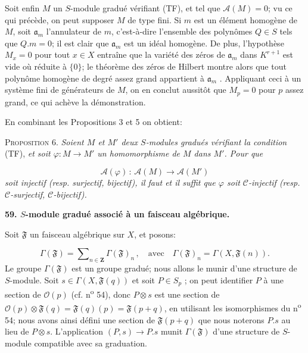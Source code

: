 Soit enfin $M$ un $S$-module gradué vérifiant (TF), et tel que $\mathcal{A}(M) = 0$; vu ce qui précède, on peut supposer $M$ de type fini. Si $m$ est un élément homogène de $M$, soit $\mathfrak{a}_{m}$ l'annulateur de $m$, c'est-à-dire l'ensemble des polynômes $Q \in S$ tels que $Q.m = 0$; il est clair que $\mathfrak{a}_{m}$ est un idéal homogène. De plus, l'hypothèse $M_{x} = 0$ pour tout $x \in X$ entraîne que la variété des zéros de $\mathfrak{a}_{m}$ dans $K^{r+1}$ est vide où réduite à $\{0\}$; le théorème des zéros de Hilbert montre alors que tout polynôme homogène de degré assez grand appartient à $\mathfrak{a}_{m}$ . Appliquant ceci à un système fini de générateurs de $M$, on en conclut aussitôt que $M_{p} = 0$ pour $p$ assez grand, ce qui achève la démonstration.

En combinant les Propositions 3 et 5 on obtient:

\textsc{Proposition} 6. \textit{Soient $M$ et $M'$ deux $S$-modules gradués vérifiant la condition} (TF), \textit{et soit $\varphi : M \to M'$ un homomorphisme de $M$ dans $M'$. Pour que}

\begin{equation*}
\mathcal{A}(\varphi) \, : \, \mathcal{A}(M) \to \mathcal{A}(M')
\end{equation*}
\textit{soit injectif (resp. surjectif, bijectif), il faut et il suffit que $\varphi$ soit $\mathcal{C}$-injectif (resp. $\mathcal{C}$-surjectif, $\mathcal{C}$-bijectif).}


\textbf{59. $S$-module gradué associé à un faisceau algébrique.}

Soit $\mathfrak{F}$ un faisceau algébrique sur $X$, et posons:

\begin{equation*}
\Gamma(\mathfrak{F}) = \sum\nolimits_{n \in \mathbf{Z}} \Gamma(\mathfrak{F})_{n} \, , \quad \mathrm{avec} \quad \Gamma(\mathfrak{F})_{n} = \Gamma(X, \mathfrak{F}(n)).
\end{equation*}
Le groupe $\Gamma(\mathfrak{F})$ est un groupe gradué; nous allons le munir d'une structure de $S$-module. Soit $s \in \Gamma(X, \mathfrak{F}(q))$ et soit $P \in S_{p}$ ; on peut identifier $P$ à une section de $\mathcal{O}(p)$ (cf. n\textsuperscript{o} 54), donc $P \otimes s$ est une section de $\mathcal{O}(p) \otimes \mathfrak{F}(q) = \mathfrak{F}(q)(p) = \mathfrak{F}(p + q)$, en utilisant les isomorphismes du n\textsuperscript{o} 54; nous avons ainsi défini une section de $\mathfrak{F}(p + q)$ que nous noterons $P.s$ au lieu de $P \otimes s$. L'application $(P, s) \to P.s$ munit $\Gamma(\mathfrak{F})$ d'une structure de $S$-module compatible avec sa graduation.

